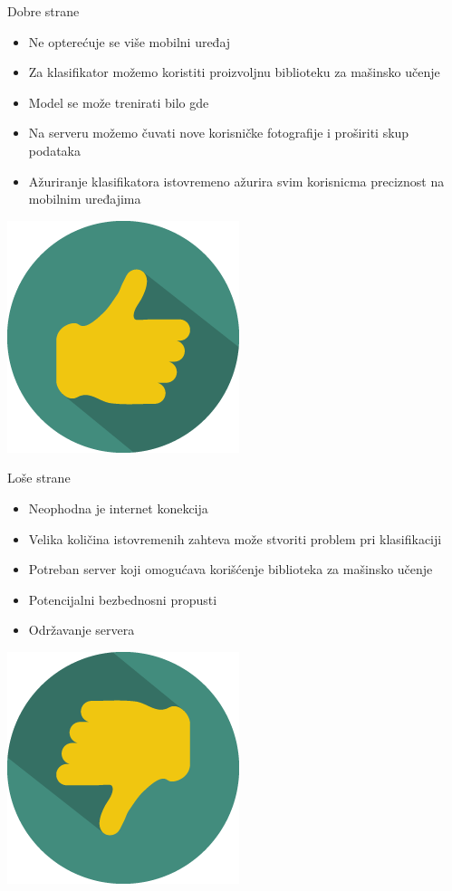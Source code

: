 \documentclass{beamer}
\begin{document}
\begin{frame}{Dobre strane}
    \begin{itemize}
        \item Ne opterećuje se više mobilni uređaj
        \item Za klasifikator možemo koristiti proizvoljnu biblioteku za mašinsko učenje
        \item Model se može trenirati bilo gde
        \item Na serveru možemo čuvati nove korisničke fotografije i proširiti skup podataka
        \item Ažuriranje klasifikatora istovremeno ažurira svim korisnicma preciznost na mobilnim uređajima
    \end{itemize}
    \begin{center}
        \includegraphics[scale=0.18]{./slike/thumbs_up.png}
    \end{center}
\end{frame}
\begin{frame}{Loše strane}
    \begin{itemize}
        \item Neophodna je internet konekcija
        \item Velika količina istovremenih zahteva može stvoriti problem pri klasifikaciji
        \item Potreban server koji omogućava korišćenje biblioteka za mašinsko učenje
        \item Potencijalni bezbednosni propusti
        \item Održavanje servera
    \end{itemize}
    \begin{center}
        \includegraphics[scale=0.23]{./slike/thumbs_down.png}
    \end{center}
\end{frame}
\end{document}

